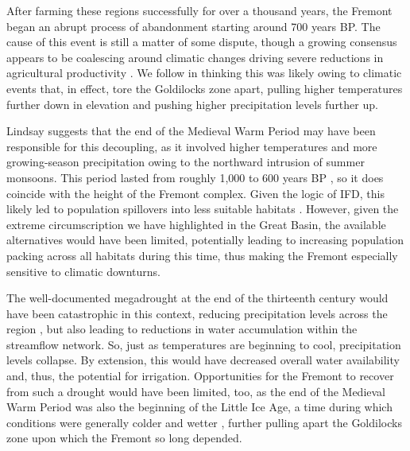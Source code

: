 \documentclass[
  number,
  preprint,
  3p]{elsarticle}
\begin{document}
After farming these regions successfully for over a thousand years, the
Fremont began an abrupt process of abandonment starting around 700 years
BP. The cause of this event is still a matter of some dispute, though a
growing consensus appears to be coalescing around climatic changes
driving severe reductions in agricultural productivity
\citep{benson2007, spangler2019, thomson2019, thomson2020, finley2020}.
We follow \citep{lindsay1986} in thinking this was likely owing to
climatic events that, in effect, tore the Goldilocks zone apart, pulling
higher temperatures further down in elevation and pushing higher
precipitation levels further up.

Lindsay suggests that the end of the Medieval Warm Period may have been
responsible for this decoupling, as it involved higher temperatures and
more growing-season precipitation owing to the northward intrusion of
summer monsoons. This period lasted from roughly 1,000 to 600 years BP
\citep{grayson2011, graumlich1993}, so it does coincide with the height
of the Fremont complex. Given the logic of IFD, this likely led to
population spillovers into less suitable habitats \citep{codding2021}.
However, given the extreme circumscription we have highlighted in the
Great Basin, the available alternatives would have been limited,
potentially leading to increasing population packing across all habitats
during this time, thus making the Fremont especially sensitive to
climatic downturns.

The well-documented megadrought at the end of the thirteenth century
\citep{cook2004} would have been catastrophic in this context, reducing
precipitation levels across the region \citep{benson2007}, but also
leading to reductions in water accumulation within the streamflow
network. So, just as temperatures are beginning to cool, precipitation
levels collapse. By extension, this would have decreased overall water
availability and, thus, the potential for irrigation. Opportunities for
the Fremont to recover from such a drought would have been limited, too,
as the end of the Medieval Warm Period was also the beginning of the
Little Ice Age, a time during which conditions were generally colder and
wetter \citep{mann2009}, further pulling apart the Goldilocks zone upon
which the Fremont so long depended.


  
\end{document}

